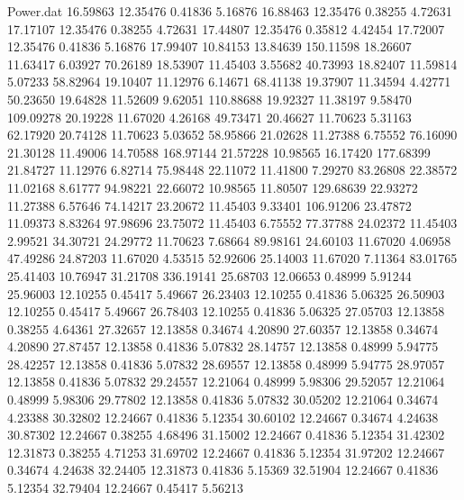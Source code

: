 \begin{filecontents}{Power.dat}
  16.59863   12.35476    0.41836    5.16876
  16.88463   12.35476    0.38255    4.72631
  17.17107   12.35476    0.38255    4.72631
  17.44807   12.35476    0.35812    4.42454
  17.72007   12.35476    0.41836    5.16876
  17.99407   10.84153   13.84639  150.11598
  18.26607   11.63417    6.03927   70.26189
  18.53907   11.45403    3.55682   40.73993
  18.82407   11.59814    5.07233   58.82964
  19.10407   11.12976    6.14671   68.41138
  19.37907   11.34594    4.42771   50.23650
  19.64828   11.52609    9.62051  110.88688
  19.92327   11.38197    9.58470  109.09278
  20.19228   11.67020    4.26168   49.73471
  20.46627   11.70623    5.31163   62.17920
  20.74128   11.70623    5.03652   58.95866
  21.02628   11.27388    6.75552   76.16090
  21.30128   11.49006   14.70588  168.97144
  21.57228   10.98565   16.17420  177.68399
  21.84727   11.12976    6.82714   75.98448
  22.11072   11.41800    7.29270   83.26808
  22.38572   11.02168    8.61777   94.98221
  22.66072   10.98565   11.80507  129.68639
  22.93272   11.27388    6.57646   74.14217
  23.20672   11.45403    9.33401  106.91206
  23.47872   11.09373    8.83264   97.98696
  23.75072   11.45403    6.75552   77.37788
  24.02372   11.45403    2.99521   34.30721
  24.29772   11.70623    7.68664   89.98161
  24.60103   11.67020    4.06958   47.49286
  24.87203   11.67020    4.53515   52.92606
  25.14003   11.67020    7.11364   83.01765
  25.41403   10.76947   31.21708  336.19141
  25.68703   12.06653    0.48999    5.91244
  25.96003   12.10255    0.45417    5.49667
  26.23403   12.10255    0.41836    5.06325
  26.50903   12.10255    0.45417    5.49667
  26.78403   12.10255    0.41836    5.06325
  27.05703   12.13858    0.38255    4.64361
  27.32657   12.13858    0.34674    4.20890
  27.60357   12.13858    0.34674    4.20890
  27.87457   12.13858    0.41836    5.07832
  28.14757   12.13858    0.48999    5.94775
  28.42257   12.13858    0.41836    5.07832
  28.69557   12.13858    0.48999    5.94775
  28.97057   12.13858    0.41836    5.07832
  29.24557   12.21064    0.48999    5.98306
  29.52057   12.21064    0.48999    5.98306
  29.77802   12.13858    0.41836    5.07832
  30.05202   12.21064    0.34674    4.23388
  30.32802   12.24667    0.41836    5.12354
  30.60102   12.24667    0.34674    4.24638
  30.87302   12.24667    0.38255    4.68496
  31.15002   12.24667    0.41836    5.12354
  31.42302   12.31873    0.38255    4.71253
  31.69702   12.24667    0.41836    5.12354
  31.97202   12.24667    0.34674    4.24638
  32.24405   12.31873    0.41836    5.15369
  32.51904   12.24667    0.41836    5.12354
  32.79404   12.24667    0.45417    5.56213

\end{filecontents}
